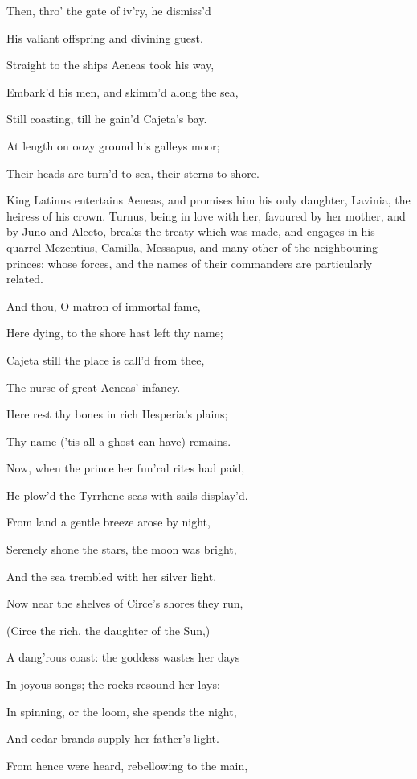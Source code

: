 Then, thro’ the gate of iv’ry, he dismiss’d

His valiant offspring and divining guest.

Straight to the ships Aeneas took his way,

Embark’d his men, and skimm’d along the sea,

Still coasting, till he gain’d Cajeta’s bay.

At length on oozy ground his galleys moor;

Their heads are turn’d to sea, their sterns to shore.


King Latinus entertains Aeneas, and promises him his only daughter, Lavinia,
the heiress of his crown. Turnus, being in love with her, favoured by her mother,
and by Juno and Alecto, breaks the treaty which was made, and engages in his
quarrel Mezentius, Camilla, Messapus, and many other of the neighbouring princes;
whose forces, and the names of their commanders are particularly related.

And thou, O matron of immortal fame,

Here dying, to the shore hast left thy name;

Cajeta still the place is call’d from thee,

The nurse of great Aeneas’ infancy.

Here rest thy bones in rich Hesperia’s plains;

Thy name (’tis all a ghost can have) remains.

Now, when the prince her fun’ral rites had paid,

He plow’d the Tyrrhene seas with sails display’d.

From land a gentle breeze arose by night,

Serenely shone the stars, the moon was bright,

And the sea trembled with her silver light.

Now near the shelves of Circe’s shores they run,

(Circe the rich, the daughter of the Sun,)

A dang’rous coast: the goddess wastes her days

In joyous songs; the rocks resound her lays:

In spinning, or the loom, she spends the night,

And cedar brands supply her father’s light.

From hence were heard, rebellowing to the main,

